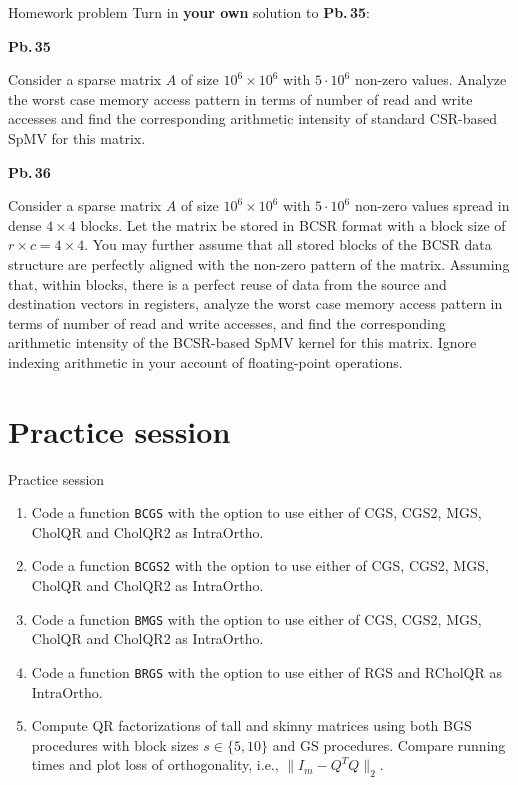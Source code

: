\documentclass[t,usepdftitle=false]{beamer}
\begin{document}
\begin{frame}{Homework problem}\vspace{.1cm}
Turn in \textbf{your own} solution to \textbf{Pb.$\,$35}:\vspace{.15cm}\\
\begin{minipage}[t]{0.1\textwidth}
\textbf{Pb.$\,$35}
\end{minipage}
\begin{minipage}[t]{0.89\textwidth}
Consider a sparse matrix $A$ of size $10^6\times 10^6$ with $5\cdot 10^6$ non-zero values.
Analyze the worst case memory access pattern in terms of number of read and write accesses and find the corresponding arithmetic intensity of standard CSR-based SpMV for this matrix.
\end{minipage}\vspace{.15cm}
\begin{minipage}[t]{0.1\textwidth}
\textbf{Pb.$\,$36}
\end{minipage}
\begin{minipage}[t]{0.89\textwidth}
Consider a sparse matrix $A$ of size $10^6\times 10^6$ with $5\cdot 10^6$ non-zero values spread in dense $4\times 4$ blocks.
Let the matrix be stored in BCSR format with a block size of $r\times c=4\times 4$.
You may further assume that all stored blocks of the BCSR data structure are perfectly aligned with the non-zero pattern of the matrix.
Assuming that, within blocks, there is a perfect reuse of data from the source and destination vectors in registers, analyze the worst case memory access pattern in terms of number of read and write accesses, and find the corresponding arithmetic intensity of the BCSR-based SpMV kernel for this matrix.
Ignore indexing arithmetic in your account of floating-point operations.
\end{minipage}
\end{frame}

\section{Practice session}

\begin{frame}[fragile]{Practice session}
\begin{enumerate}
\item Code a function \texttt{BCGS} with the option to use either of CGS, CGS2, MGS, CholQR and CholQR2 as IntraOrtho. 
\item Code a function \texttt{BCGS2} with the option to use either of CGS, CGS2, MGS, CholQR and CholQR2 as IntraOrtho. 
\item Code a function \texttt{BMGS} with the option to use either of CGS, CGS2, MGS, CholQR and CholQR2 as IntraOrtho. 
\item Code a function \texttt{BRGS} with the option to use either of RGS and RCholQR as IntraOrtho. 
\item Compute QR factorizations of tall and skinny matrices using both BGS procedures with block sizes $s\in\{5,10\}$ and GS procedures.
Compare running times and plot loss of orthogonality, i.e., $\|I_m-Q^TQ\|_2$.
\end{enumerate}
\end{frame}
\end{document}
